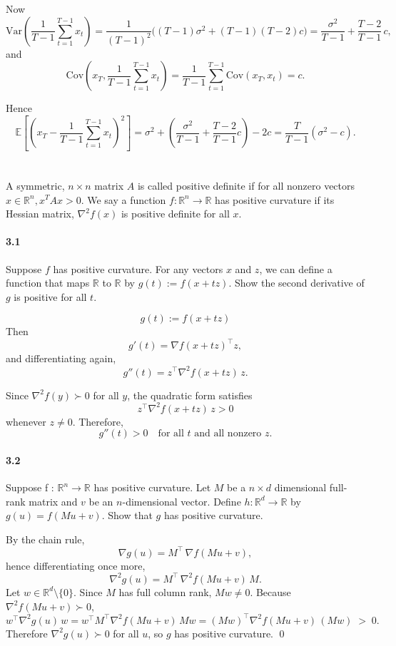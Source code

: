 \documentclass[a4paper]{article}
\begin{document}
Now
\[
\mathrm{Var}(\frac{1}{T-1}\sum_{t=1}^{T-1} x_t)
= \frac{1}{(T-1)^2}\Big( (T-1)\sigma^2 + (T-1)(T-2)c \Big)
= \frac{\sigma^2}{T-1} + \frac{T-2}{T-1}\,c,
\]
and
\[
\mathrm{Cov}(x_T, \frac{1}{T-1}\sum_{t=1}^{T-1} x_t)
= \frac{1}{T-1}\sum_{t=1}^{T-1}\mathrm{Cov}(x_T, x_t) = c.
\]

Hence
\[
\mathbb{E}\!\left[\left(x_T - \frac{1}{T-1}\sum_{t=1}^{T-1} x_t\right)^2\right]
= \sigma^2 + \left( \frac{\sigma^2}{T-1} + \frac{T-2}{T-1}c \right) - 2c
= \frac{T}{T-1}(\sigma^2 - c).
\]


\section{}
A symmetric, $n \times n$ matrix $A$ is called positive definite if for all nonzero vectors $x \in \mathbb{R}^n , x^T Ax > 0$.
We say a function $f : \mathbb{R}^n \rightarrow \mathbb{R}$ has positive curvature if its Hessian matrix, $\nabla^2 f(x)$ is positive definite for all $x$.
\paragraph{3.1}
Suppose $f$ has positive curvature. For any vectors $x$ and $z$, we can define a function that maps $\mathbb{R}$ to $\mathbb{R}$ by $g(t) := f (x + tz)$.
Show the second derivative of $g$ is positive for all $t$.

$$g(t) := f(x + tz)$$
Then
\[
g'(t) = \nabla f(x+tz)^\top z,
\]
and differentiating again,
\[
g''(t) = z^\top \nabla^2 f(x+tz)\, z.
\]

Since $\nabla^2 f(y) \succ 0$ for all $y$, the quadratic form satisfies
\[
z^\top \nabla^2 f(x+tz)\, z > 0
\]
whenever $z \neq 0$. Therefore,
\[
g''(t) > 0 \quad \text{for all $t$ and all nonzero $z$.}
\]
\paragraph{3.2}
Suppose f : $\mathbb{R}^n \rightarrow \mathbb{R}$ has positive curvature.
Let $M$ be a $n \times d$ dimensional full-rank matrix and $v$ be an $n$-dimensional vector.
Define $h : \mathbb{R}^d \rightarrow \mathbb{R}$ by $g(u) = f (M u + v).$
Show that $g$ has positive curvature.

By the chain rule,
\[
\nabla g(u)=M^{\!\top}\,\nabla f(Mu+v),
\]
hence differentiating once more,
\[
\nabla^2 g(u)=M^{\!\top}\,\nabla^2 f(Mu+v)\,M.
\]
Let \(w\in\mathbb{R}^d\setminus\{0\}\). Since \(M\) has full column rank, \(Mw\neq 0\).
Because \(\nabla^2 f(Mu+v)\succ 0\),
\[
w^{\!\top}\nabla^2 g(u)\,w
= w^{\!\top} M^{\!\top}\nabla^2 f(Mu+v)\,Mw
= (Mw)^{\!\top}\nabla^2 f(Mu+v)\,(Mw) \;>\; 0.
\]
Therefore \(\nabla^2 g(u)\succ 0\) for all \(u\), so \(g\) has positive curvature. \qed
\end{document}
